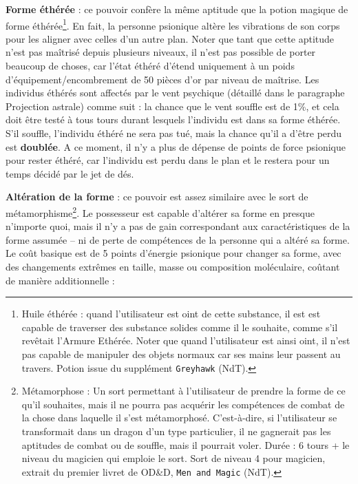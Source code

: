\documentclass[11pt]{article}
\begin{document}
{\bigskip

\textbf{Forme éthérée} : ce pouvoir confère la même aptitude que la potion magique de forme éthérée\footnote{
\og Huile éthérée : quand l'utilisateur est oint de cette substance, il est est capable de traverser des substance solides comme il le souhaite, comme s'il revêtait l'Armure Ethérée. Noter que quand l'utilisateur est ainsi oint, il n'est pas capable de manipuler des objets normaux car ses mains leur passent au travers. \fg{} Potion issue du supplément \texttt{Greyhawk} (NdT).
}. En fait, la personne psionique altère les vibrations de son corps pour les aligner avec celles d'un autre plan. Noter que tant que cette aptitude n'est pas maîtrisé depuis plusieurs niveaux, il n'est pas possible de porter beaucoup de choses, car l'état éthéré d'étend uniquement à un poids d'équipement/encombrement de 50 pièces d'or par niveau de maîtrise. Les individus éthérés sont affectés par le vent psychique (détaillé dans le paragraphe Projection astrale) comme suit : la chance que le vent souffle est de 1\%, et cela doit être testé à tous tours durant lesquels l'individu est dans sa forme éthérée. S'il souffle, l'individu éthéré ne sera pas tué, mais la chance qu'il a d'être perdu est \textbf{doublée}. A ce moment, il n'y a plus de dépense de points de force psionique pour rester éthéré, car l'individu est perdu dans le plan et le restera pour un temps décidé par le jet de dés.

\bigskip

\textbf{Altération de la forme} : ce pouvoir est assez similaire avec le sort de métamorphisme\footnote{
\og Métamorphose : Un sort permettant à l'utilisateur de prendre la forme de ce qu'il souhaites, mais il ne pourra pas acquérir les compétences de combat de la chose dans laquelle il s'est métamorphosé. C'est-à-dire, si l'utilisateur se transformait dans un dragon d'un type particulier, il ne gagnerait pas les aptitudes de combat ou de souffle, mais il pourrait voler. Durée : 6 tours + le niveau du magicien qui emploie le sort. \fg{} Sort de niveau 4 pour magicien, extrait du premier livret de OD\&D, \texttt{Men and Magic} (NdT).
}. Le possesseur est capable d'altérer sa forme en presque n'importe quoi, mais il n'y a pas de gain correspondant aux caractéristiques de la forme assumée -- ni de perte de compétences de la personne qui a altéré sa forme. Le coût basique est de 5 points d'énergie psionique pour changer sa forme, avec des changements extrêmes en taille, masse ou composition moléculaire, coûtant de manière additionnelle :

}
\end{document}
